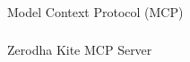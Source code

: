 \begin{frame}[fragile]\frametitle{}
\begin{center}
{\Large Model Context Protocol (MCP)}
\end{center}
\end{frame}


\begin{frame}[fragile]\frametitle{}
\begin{center}
{\Large Zerodha Kite MCP Server}
\end{center}
\end{frame}
